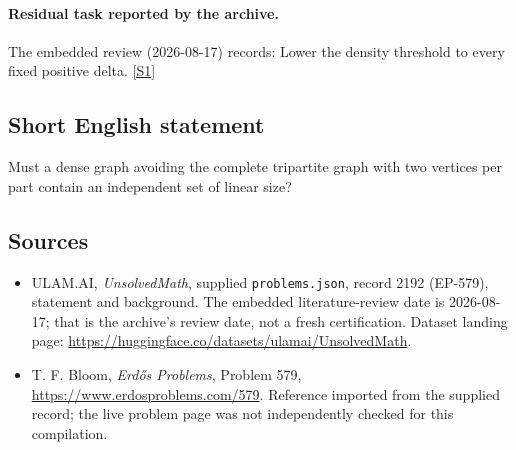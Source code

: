 \documentclass[11pt,a4paper]{article}
\newcommand{\sref}[2]{\hyperlink{source:#1:#2}{[S#2]}}
\begin{document}
\paragraph{Residual task reported by the archive.}

The embedded review (2026-08-17) records: Lower the density threshold to every fixed positive delta. \sref{2192}{1}

\subsection{Short English statement}

Must a dense graph avoiding the complete tripartite graph with two vertices per part contain an independent set of linear size?

\subsection{Sources}

{\small

\begin{itemize}

\item[\hypertarget{source:2192:1}{S1}] ULAM.AI, \emph{UnsolvedMath}, supplied \texttt{problems.json}, record 2192 (EP-579), statement and background. The embedded literature-review date is 2026-08-17; that is the archive’s review date, not a fresh certification. Dataset landing page: \url{https://huggingface.co/datasets/ulamai/UnsolvedMath}.

\item[\hypertarget{source:2192:2}{S2}] T. F. Bloom, \emph{Erdős Problems}, Problem 579, \url{https://www.erdosproblems.com/579}. Reference imported from the supplied record; the live problem page was not independently checked for this compilation.

\end{itemize}

}

\label{end:2192}
\end{document}
